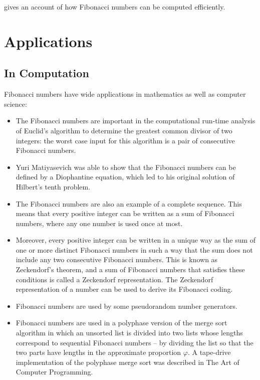 \citet{Rohl:1989} gives an account of how Fibonacci numbers can be computed efficiently.

\section{Applications}

\subsection{In Computation}

Fibonacci numbers have wide applications in mathematics as well as computer science:

\begin{itemize}
\item The Fibonacci numbers are important in the computational run-time analysis of Euclid's algorithm to determine the greatest common divisor of two integers: the worst case input for this algorithm is a pair of consecutive Fibonacci numbers.

\item Yuri Matiyasevich was able to show that the Fibonacci numbers can be defined by a Diophantine equation, which led to his original solution of Hilbert's tenth problem.

\item The Fibonacci numbers are also an example of a complete sequence. This means that every positive integer can be written as a sum of Fibonacci numbers, where any one number is used once at most.

\item Moreover, every positive integer can be written in a unique way as the sum of one or more distinct Fibonacci numbers in such a way that the sum does not include any two consecutive Fibonacci numbers. This is known as Zeckendorf's theorem, and a sum of Fibonacci numbers that satisfies these conditions is called a Zeckendorf representation. The Zeckendorf representation of a number can be used to derive its Fibonacci coding.

\item Fibonacci numbers are used by some pseudorandom number generators.

\item Fibonacci numbers are used in a polyphase version of the merge sort algorithm in which an unsorted list is divided into two lists whose lengths correspond to sequential Fibonacci numbers -- by dividing the list so that the two parts have lengths in the approximate proportion $\varphi$. A tape-drive implementation of the polyphase merge sort was described in The Art of Computer Programming.


\end{itemize}
